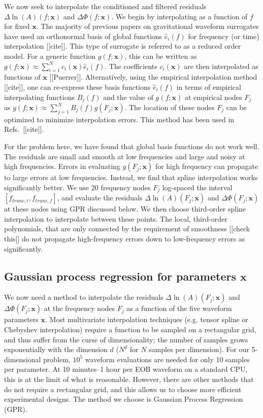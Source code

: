 \documentclass[prd,aps,letter,twocolumn,floatfix,notitlepage,nofootinbib]{revtex4-1}
\def\bx{\mathbf{x}}
\begin{document}
We now seek to interpolate the conditioned and filtered residuals $\Delta\ln(A)(f; \bx)$ and $\Delta\Phi(f; \bx)$. We begin by interpolating as a function of $f$ for fixed $\bx$. The majority of previous papers on gravitational waveform surrogates have used an orthonormal basis of global functions $\hat e_i(f)$ for frequency (or time) interpolation [[cite]]. This type of surrogate is referred to as a reduced order model. For a generic function $g(f; \bx)$, this can be written as $g(f; \bx) \approx \sum_{i=1}^N c_i(\bx) \hat e_i(f)$. The coefficients $c_i(\bx)$ are then interpolated as functions of $\bx$ [[Puerrer]]. Alternatively, using the empirical interpolation method [[cite]], one can re-express these basis functions $\hat e_i(f)$ in terms of empirical interpolating functions $B_j(f)$ and the value of $g(f; \bx)$ at empirical nodes $F_j$ as $g(f; \bx) \approx \sum_{j=1}^N B_j(f) g(F_j; \bx)$. The location of these nodes $F_j$ can be optimized to minimize interpolation errors. This method has been used in Refs.~[[cite]].

For the problem here, we have found that global basis functions do not work well. The residuals are small and smooth at low frequencies and large and noisy at high frequencies. Errors in evaluating $g(F_j;\bx)$ for high frequency can propagate to large errors at low frequencies. Instead, we find that spline interpolation works significantly better. We use 20 frequency nodes $F_j$ log-spaced the interval $[f_{trunc,i}, f_{trunc,f}]$, and evaluate the residuals $\Delta\ln(A)(F_j; \bx)$ and $\Delta\Phi(F_j; \bx)$ at these nodes using GPR discussed below. We then choose third-order spline interpolation to interpolate between these points. The local, third-order polynomials, that are only connected by the requirement of smoothness [[check this]] do not propagate high-frequency errors down to low-frequency errors as significantly.


\subsection{Gaussian process regression for parameters $\bx$}

We now need a method to interpolate the residuals $\Delta\ln(A)(F_j; \bx)$ and $\Delta\Phi(F_j; \bx)$ at the frequency nodes $F_j$ as a function of the five waveform parameters $\bx$. Most multivariate interpolation techniques (e.g. tensor spline or Chebyshev interpolation) require a function to be sampled on a rectangular grid, and thus suffer from the curse of dimensionality; the number of samples grows exponentially with the dimension $d$ ($N^d$ for $N$ samples per dimension). For our 5-dimensional problem, $10^5$ waveform evaluations are needed for only 10 samples per parameter. At 10 minutes--1 hour per EOB waveform on a standard CPU, this is at the limit of what is reasonable. However, there are other methods that do not require a rectangular grid, and this allows us to choose more efficient experimental designs. The method we choose is Gaussian Process Regression (GPR).
\end{document}

